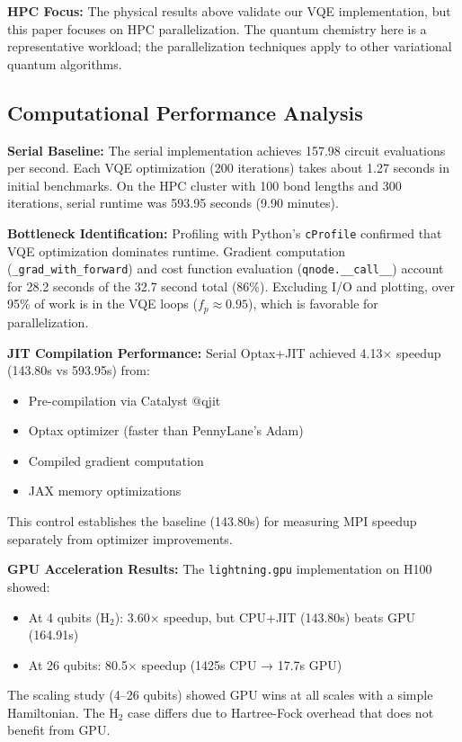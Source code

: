 \documentclass[11pt]{article}
\begin{document}
\textbf{HPC Focus:} The physical results above validate our VQE implementation, but this paper focuses on HPC parallelization. The quantum chemistry here is a representative workload; the parallelization techniques apply to other variational quantum algorithms.

\subsection{Computational Performance Analysis}

\textbf{Serial Baseline:} The serial implementation achieves 157.98 circuit evaluations per second. Each VQE optimization (200 iterations) takes about 1.27 seconds in initial benchmarks. On the HPC cluster with 100 bond lengths and 300 iterations, serial runtime was 593.95 seconds (9.90 minutes).

\textbf{Bottleneck Identification:} Profiling with Python's \texttt{cProfile} confirmed that VQE optimization dominates runtime. Gradient computation (\texttt{\_grad\_with\_forward}) and cost function evaluation (\texttt{qnode.\_\_call\_\_}) account for 28.2 seconds of the 32.7 second total (86\%). Excluding I/O and plotting, over 95\% of work is in the VQE loops ($f_p \approx 0.95$), which is favorable for parallelization.

\textbf{JIT Compilation Performance:} Serial Optax+JIT achieved 4.13× speedup (143.80s vs 593.95s) from:
\begin{itemize}
    \item Pre-compilation via Catalyst @qjit
    \item Optax optimizer (faster than PennyLane's Adam)
    \item Compiled gradient computation
    \item JAX memory optimizations
\end{itemize}

This control establishes the baseline (143.80s) for measuring MPI speedup separately from optimizer improvements.

\textbf{GPU Acceleration Results:} The \texttt{lightning.gpu} implementation on H100 showed:
\begin{itemize}
    \item At 4 qubits (H$_2$): 3.60× speedup, but CPU+JIT (143.80s) beats GPU (164.91s)
    \item At 26 qubits: 80.5× speedup (1425s CPU → 17.7s GPU)
\end{itemize}

The scaling study (4--26 qubits) showed GPU wins at all scales with a simple Hamiltonian. The H$_2$ case differs due to Hartree-Fock overhead that does not benefit from GPU.
\end{document}
